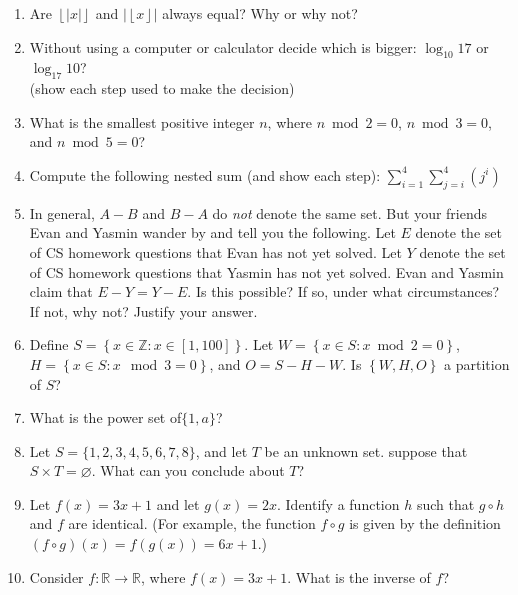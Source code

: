 \documentclass[11pt, oneside]{article}   	%
\let\emptyset\varnothing
\begin{document}
\begin{enumerate}
\item Are $\left\lfloor\left| x \right|\right\rfloor$ and $\left|\left\lfloor x \right\rfloor\right|$ always equal? Why or why not?
\item Without using a computer or calculator decide which is bigger: $\log_{10}17$ or $\log_{17}10$? \\(show each step used to make the decision)
\item What is the smallest positive integer $n$, where $n\bmod 2=0$, $n\bmod3=0$, and $n\bmod5=0$?
\item Compute the following nested sum (and show each step): $\displaystyle \sum_{i=1}^4\sum_{j=i}^4 \left(j^i\right)$
\item In general, $A-B$ and $B-A$ do \textit{not} denote the same set.
But your friends Evan and Yasmin wander by and tell you the following. 
Let $E$ denote the set of CS homework questions that Evan has not yet solved. 
Let $Y$ denote the set of CS homework questions that Yasmin has not yet solved. 
Evan and Yasmin claim that $E-Y = Y-E$. 
Is this possible? If so, under what circumstances? If not, why not? Justify your answer.
\item Define $S=\left\{x\in \mathbb{Z}: x \in \left[1,100\right]\right\}$.
Let $W=\left\{x \in S: x \bmod 2 = 0\right\}$, $H=\left\{x \in S:x \mod 3=0\right\}$, and $O=S-H-W$.
Is $\left\{W,H,O\right\}$ a partition of $S$?
\item What is the power set of$\{1,a\}$?
\item Let $S = \{1,2,3,4,5,6,7,8\}$, and let $T$ be an unknown set.
suppose that $S\times T=\emptyset$.
What can you conclude about $T$?
\item Let $f(x)=3x+1$ and let $g(x)=2x$. 
Identify a function $h$ such that $g\circ h$ and $f$ are identical.
(For example, the function $f \circ g$ is given by the definition $(f \circ g)(x) = f(g(x)) = 6x + 1$.)
\item Consider $f:\mathbb{R}\rightarrow\mathbb{R}$, where $f(x)=3x+1$.
What is the inverse of $f$?

\end{enumerate}
\end{document}
